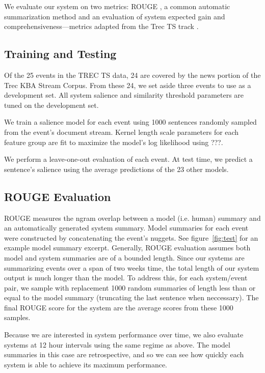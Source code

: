 We evaluate our system on two metrics: ROUGE \cite{?}, a common automatic
summarization method and an evaluation of system expected gain 
and comprehensiveness---metrics adapted 
from the Trec TS track \cite{?}.


\subsection{Training and Testing}

Of the 25 events in the TREC TS data, 24 are covered by the news portion 
of the Trec KBA Stream Corpus.
From these 24, we set aside three events to use as a development set.
All system salience and similarity threshold parameters are tuned on the
development set.

We train a salience model for each event using 1000 sentences randomly sampled
from the event's document stream. Kernel length scale parameters  for each
feature group are fit to maximize
the model's log likelihood using ???.

We perform a leave-one-out evaluation of each event.
At test time, we predict a sentence's salience using the average predictions
of the 23 other models.   

\subsection{ROUGE Evaluation}

ROUGE measures the ngram overlap between a model (i.e. human) summary 
and an automatically generated system summary. 
Model summaries for each event were constructed by concatenating the event's 
nuggets. 
See figure~\ref{fig:test} for an example model summary excerpt.
Generally, ROUGE evaluation assumes both model and system summaries
are of a bounded length. Since our systems are summarizing events over a span
of two weeks time, the total length of our system output is much longer than
the model. To address this, for each system/event pair, we sample with replacement
1000 random summaries of length less than or equal to the model summary 
(truncating the last sentence when neccessary). The final ROUGE score for the 
system are the average scores from these 1000 samples.

Because we are interested in system performance over time, we also evaluate 
systems at 12 hour intervals using the same regime as above. 
The model summaries in this case are retrospective, 
and so we can see how quickly
each system is able to achieve its maximum performance.

